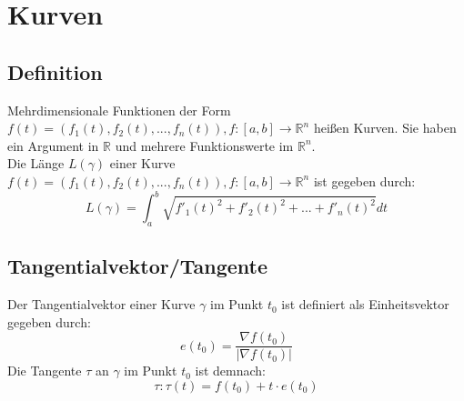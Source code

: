 
\section{Kurven}
\label{sec:kurven}

\subsection{Definition}
\label{sub:definition}

Mehrdimensionale Funktionen der Form $f(t) = (f_1(t),f_2(t),...,f_n(t)), f:[a,b] \rightarrow \mathbb{R}^n$ heißen Kurven.
Sie haben ein Argument in $\mathbb{R}$ und mehrere Funktionswerte im $\mathbb{R}^n$.
\\
Die Länge $L(\gamma)$ einer Kurve $f(t) = (f_1(t),f_2(t),...,f_n(t)), f:[a,b] \rightarrow \mathbb{R}^n$ ist gegeben durch:
\begin{equation}
	L(\gamma) = \int_a^b \sqrt{f'_1(t)^2 + f'_2(t)^2 + ... + f'_n(t)^2}dt
\end{equation}

\subsection{Tangentialvektor/Tangente}
\label{sub:tangentialvektor_tangente}

Der Tangentialvektor einer Kurve $\gamma$ im Punkt $t_0$ ist definiert als Einheitsvektor gegeben durch: 
\begin{equation}
	e(t_0) = \frac{\nabla f(t_0)}{|\nabla f(t_0)|}
\end{equation}
Die Tangente $\tau$ an $\gamma$ im Punkt $t_0$ ist demnach:
\begin{equation}
	\tau : \tau(t) = f(t_0) +  t \cdot e(t_0)
\end{equation}
